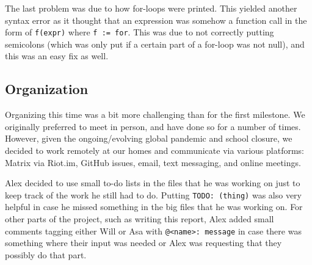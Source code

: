 \documentclass{article}
\begin{document}
The last problem was due to how for-loops were printed. This yielded another
syntax error as it thought that an expression was somehow a function call in the
form of \verb$f(expr)$ where \verb$f := for$. This was due
to not correctly putting semicolons (which was only put if a certain part of a
for-loop was not null), and this was an easy fix as well.

\subsection{Organization}


Organizing this time was a bit more challenging than for the first milestone. We originally preferred to meet in person, and have done so for a number of times.
However, given the ongoing/evolving global pandemic and school closure, we decided to work remotely at
our homes and communicate via various platforms: Matrix via Riot.im,
GitHub issues, email, text messaging, and online meetings.

Alex decided to use small to-do lists in the files that he was working on just
to keep track of the work he still had to do. Putting \verb|TODO: (thing)|
was also very helpful in case he missed something in the big files that he was
working on. For other parts of the project, such as writing this report, Alex
added small comments tagging either Will or Asa with \verb|@<name>: message| in
case there was something where their input was needed or Alex was requesting that
they possibly do that part.


\nocite{*}

{}

\end{document}

